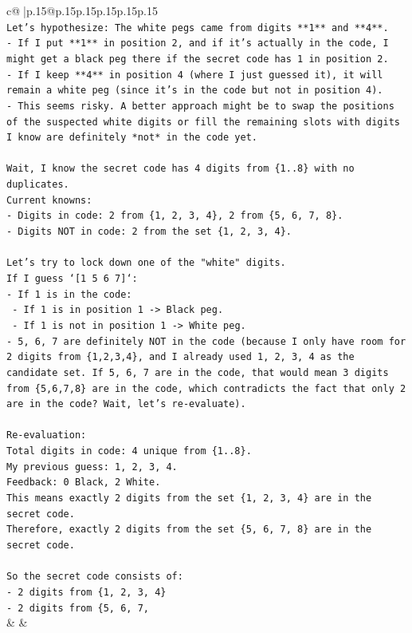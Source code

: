 \documentclass{article}
\begin{document}
{\begin{supertabular}{c@{$\;$}|p{.15\linewidth}@{}p{.15\linewidth}p{.15\linewidth}p{.15\linewidth}p{.15\linewidth}p{.15\linewidth}}
{{{\\ 
\texttt{Let's hypothesize: The white pegs came from digits **1** and **4**.} \\
\texttt{{-} If I put **1** in position 2, and if it's actually in the code, I might get a black peg there if the secret code has 1 in position 2.} \\
\texttt{{-} If I keep **4** in position 4 (where I just guessed it), it will remain a white peg (since it's in the code but not in position 4).} \\
\texttt{{-} This seems risky. A better approach might be to swap the positions of the suspected white digits or fill the remaining slots with digits I know are definitely *not* in the code yet.} \\
\\ 
\texttt{Wait, I know the secret code has 4 digits from \{1..8\} with no duplicates.} \\
\texttt{Current knowns:} \\
\texttt{{-} Digits in code: 2 from \{1, 2, 3, 4\}, 2 from \{5, 6, 7, 8\}.} \\
\texttt{{-} Digits NOT in code: 2 from the set \{1, 2, 3, 4\}.} \\
\\ 
\texttt{Let's try to lock down one of the "white" digits.} \\
\texttt{If I guess `{[}1 5 6 7{]}`:} \\
\texttt{{-} If 1 is in the code:} \\
\texttt{  {-} If 1 is in position 1 {-}> Black peg.} \\
\texttt{  {-} If 1 is not in position 1 {-}> White peg.} \\
\texttt{{-} 5, 6, 7 are definitely NOT in the code (because I only have room for 2 digits from \{1,2,3,4\}, and I already used 1, 2, 3, 4 as the candidate set. If 5, 6, 7 are in the code, that would mean 3 digits from \{5,6,7,8\} are in the code, which contradicts the fact that only 2 are in the code? Wait, let's re{-}evaluate).} \\
\\ 
\texttt{Re{-}evaluation:} \\
\texttt{Total digits in code: 4 unique from \{1..8\}.} \\
\texttt{My previous guess: 1, 2, 3, 4.} \\
\texttt{Feedback: 0 Black, 2 White.} \\
\texttt{This means exactly 2 digits from the set \{1, 2, 3, 4\} are in the secret code.} \\
\texttt{Therefore, exactly 2 digits from the set \{5, 6, 7, 8\} are in the secret code.} \\
\\ 
\texttt{So the secret code consists of:} \\
\texttt{{-} 2 digits from \{1, 2, 3, 4\}} \\
\texttt{{-} 2 digits from \{5, 6, 7,} \\
            }
        }
    }
    & & \\ \\


\end{supertabular}}
\end{document}

